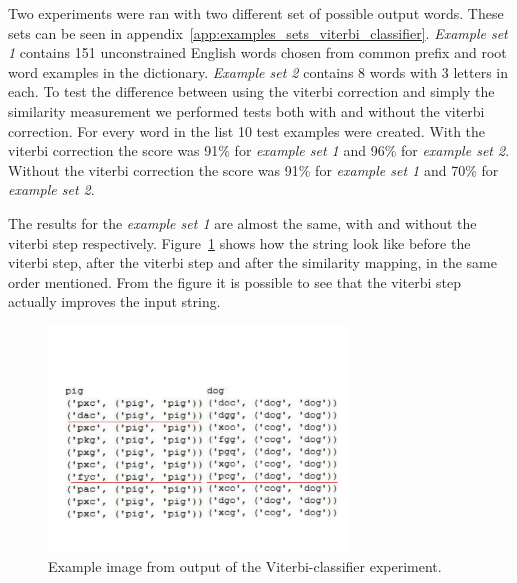  Two experiments were ran with two different set of possible output words.
 These sets can be seen in appendix~\ref{app:examples_sets_viterbi_classifier}.
 \emph{Example set 1} contains 151 unconstrained English words chosen from common prefix and root word examples in the dictionary.
 \emph{Example set 2} contains 8 words with 3 letters in each.
 To test the difference between using the viterbi correction and simply the similarity measurement we performed tests both with and without the viterbi correction.
 For every word in the list 10 test examples were created.
 With the viterbi correction the score was 91\% for \emph{example set 1} and 96\% for \emph{example set 2}.
 Without the viterbi correction the score was 91\% for \emph{example set 1} and 70\% for \emph{example set 2}.

 The results for the \emph{example set 1} are almost the same, with and without the viterbi step respectively.
 Figure~\ref{fig:viterbifig} shows how the string look like before the viterbi step, after the viterbi step and after the similarity mapping, in the same order mentioned.
 From the figure it is possible to see that the viterbi step actually improves the input string.

    \begin{figure}[htb] 
      \begin{center}
	\leavevmode
	\includegraphics[width=80mm]{viterbiimage.pdf}%
      \end{center}
      \caption{Example image from output of the Viterbi-classifier experiment.}
      \label{fig:viterbifig}
    \end{figure}






